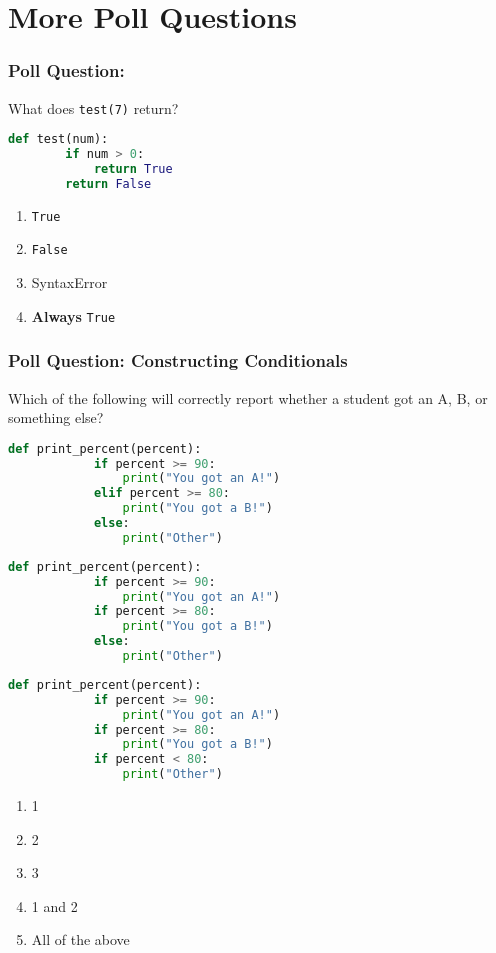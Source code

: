 \documentclass{beamer}
\begin{document}
\section{More Poll Questions}
\begin{frame}[fragile]
	\frametitle{Poll Question: }
	What does \lstinline|test(7)| return?
	\begin{lstlisting}[language=Python, autogobble]
	def test(num):
		if num > 0:
			return True
		return False
	\end{lstlisting}
	\vfill
	\begin{enumerate}[A]
		\item \lstinline|True|
		\item \lstinline|False|
		\item SyntaxError
		\item \textbf{Always} \lstinline|True|
	\end{enumerate}
\end{frame}

%
%
\begin{frame}[fragile]
	\frametitle{Poll Question: Constructing Conditionals}
	Which of the following will correctly report whether a student got an A, B, or something else?\\
	\vfill
	\begin{minipage}{0.32\textwidth}
		\begin{lstlisting}[language=Python, autogobble,basicstyle=\tiny,numbers=none]
		def print_percent(percent):
			if percent >= 90:
				print("You got an A!")
			elif percent >= 80:
				print("You got a B!")
			else:
				print("Other")
		\end{lstlisting}
	\end{minipage}
	\begin{minipage}{0.32\textwidth}
		\begin{lstlisting}[language=Python, autogobble,basicstyle=\tiny,numbers=none]
		def print_percent(percent):
			if percent >= 90:
				print("You got an A!")
			if percent >= 80:
				print("You got a B!")
			else:
				print("Other")
		\end{lstlisting}
	\end{minipage}
	\begin{minipage}{0.32\textwidth}
		\begin{lstlisting}[language=Python, autogobble,basicstyle=\tiny,numbers=none]
		def print_percent(percent):
			if percent >= 90:
				print("You got an A!")
			if percent >= 80:
				print("You got a B!")
			if percent < 80:
				print("Other")
		\end{lstlisting}
	\end{minipage}
	\vfill
	\begin{enumerate}[A]
		\item 1
		\item 2
		\item 3
		\item 1 and 2
		\item All of the above
	\end{enumerate}
\end{frame}
\end{document}
